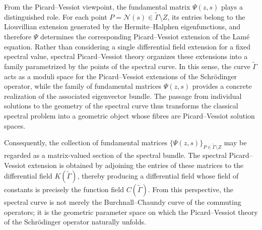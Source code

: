 \documentclass[a4paper,12pt]{article}
\begin{document}
From the Picard–Vessiot viewpoint, the fundamental matrix
\(\Psi(z,s)\) plays a distinguished role. For each point
\(P=\mathcal N(s)\in\widetilde{\Gamma}\setminus Z\),
its entries belong to the Liouvillian extension generated by the
Hermite–Halphen eigenfunctions, and therefore \(\Psi\) determines the
corresponding Picard–Vessiot extension of the Lamé equation.
Rather than considering a single differential field extension for a
fixed spectral value, spectral Picard–Vessiot theory organizes these
extensions into a family parametrized by the points of the spectral
curve. In this sense, the curve \(\widetilde{\Gamma}\) acts as a moduli
space for the Picard–Vessiot extensions of the Schrödinger operator,
while the family of fundamental matrices \(\Psi(z,s)\) provides a
concrete realization of the associated eigenvector bundle. The passage
from individual solutions to the geometry of the spectral curve thus
transforms the classical spectral problem into a geometric object whose
fibres are Picard–Vessiot solution spaces.


Consequently, the collection of fundamental matrices
\(\{\Psi(z,s)\}_{P\in\widetilde{\Gamma}\setminus Z}\)
may be regarded as a matrix-valued section of the spectral bundle.
The spectral Picard–Vessiot extension is obtained by adjoining the
entries of these matrices to the differential field
\(K(\widetilde{\Gamma})\), thereby producing a differential field whose
field of constants is precisely the function field
\(C(\widetilde{\Gamma})\). From this perspective, the spectral curve is
not merely the Burchnall–Chaundy curve of the commuting operators; it is
the geometric parameter space on which the Picard–Vessiot theory of the
Schrödinger operator naturally unfolds.
\end{document}

